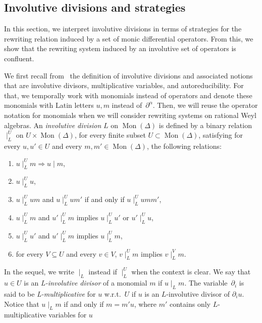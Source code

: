 \documentclass[11pt]{article}
\theoremstyle{definition}
\DeclareMathOperator{\Mon}{Mon}
\newcommand\divInv[1]{\mid_{#1}}
\begin{document}
\subsection{Involutive divisions and strategies}
\label{sec:involutive_divisions_ and_strategies}

In this section, we interpret involutive divisions in terms of strategies
for the rewriting relation induced by a set of monic differential
operators. From this, we show that the rewriting system induced by an
involutive set of operators is confluent.
\medskip

We first recall from~\cite{MR1627129} the definition of involutive
divisions and associated notions that are involutive divisors,
multiplicative variables, and autoreducibility. For that, we temporally
work with monomials instead of operators and denote these monomials with
Latin letters $u,m$ instead of~$\partial^\alpha$. Then, we will reuse the
operator notation for monomials when we will consider rewriting systems
on rational Weyl algebras. An {\em involutive division} $L$ on
$\Mon(\Delta)$ is defined by a binary relation $\divInv{L}^U$ on
$U\times\Mon(\Delta)$, for every finite subset $U\subset\Mon(\Delta)$,
satisfying for every $u,u'\in U$ and every $m,m'\in\Mon(\Delta)$, the
following relations:
\begin{enumerate}[label=\alph*)]
\item\label{it:div} $u\divInv{L}^Um\Rightarrow u\mid m$,
\item\label{it:unit} $u\divInv{L}^Uu$,
\item\label{it:mul} $u\divInv{L}^Uum$ and $u\divInv{L}^Uum'$ if and only
  if $u\divInv{L}^Uumm'$,
\item\label{it:vertex} $u\divInv{L}^Um$ and $u'\divInv{L}^Um$ implies
  $u\divInv{L}^Uu'$ or $u'\divInv{L}^Uu$,
\item\label{it:transitivity} $u\divInv{L}^Uu'$ and $u'\divInv{L}^Um$
  implies $u\divInv{L}^Um$,
\item\label{it:filter} for every $V\subseteq U$ and every $v\in V$,
  $v\divInv{L}^Um$ implies $v\divInv{L}^Vm$. 
\end{enumerate}
In the sequel, we write $\divInv{L}$ instead if $\divInv{L}^U$ when the
context is clear. We say that $u\in U$ is an {\em L-involutive divisor}
of a monomial $m$ if $u\divInv{L}m$. The variable~$\partial_i$ is said to be
{\em L-multiplicative} for $u$ w.r.t.\ $U$ if $u$ is an $L$-involutive
divisor of $\partial_iu$. Notice that $u\divInv{L}m$ if and only if
$m=m'u$, where $m'$ contains only $L$-multiplicative variables for $u$
\end{document}
